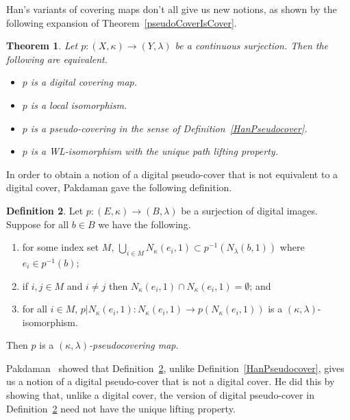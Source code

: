 \documentclass{article} \UseRawInputEncoding
\theoremstyle{plain}
\newtheorem{thm}{Theorem}
\theoremstyle{definition}
\newtheorem{definition}[thm]{Definition}
\numberwithin{thm}{section}
\begin{document}
Han's variants of covering maps don't all give us new notions, as
shown by the following expansion of Theorem~\ref{pseudoCoverIsCover}.

\begin{thm}
{\rm \cite{BxVariants}}
\label{coverEquivs}
 Let $p: (X,\kappa) \to (Y,\lambda)$ be a continuous
    surjection. Then the following are equivalent.
    \begin{itemize}
        \item $p$ is a digital covering map.
        \item $p$ is a local isomorphism.
        \item $p$ is a pseudo-covering in the sense of
            Definition~\ref{HanPseudocover}.
        \item $p$ is a WL-isomorphism with the unique
              path lifting property.
\end{itemize}
\end{thm}

In order to obtain a notion of a digital pseudo-cover that is not equivalent to
a digital cover, Pakdaman gave the following definition.

\begin{definition}
    \label{PakPseudocovering}
    {\rm \cite{Pak22}}
    Let $p: (E,\kappa) \to (B,\lambda)$ be a surjection
    of digital images. Suppose for all $b \in B$ we
    have the following.
    \begin{enumerate}
        \item for some index set $M$,
              $\bigcup_{i \in M} N_{\kappa}(e_i,1)
              \subset p^{-1}(N_{\lambda}(b,1))$ where
              $e_i \in p^{-1}(b)$;
        \item if $i,j \in M$ and $i \neq j$ then
              $N_{\kappa}(e_i,1) \cap N_{\kappa}(e_i,1) =
              \emptyset$; and
        \item for all $i \in M$,
              $p|{N_{\kappa}(e_i,1)}: N_{\kappa}(e_i,1) \to
               p(N_{\kappa}(e_i,1))$ is a
               $(\kappa, \lambda)$-isomorphism.
    \end{enumerate}
    Then $p$ is a {\em $(\kappa,\lambda)$-pseudocovering map}.
\end{definition}

Pakdaman~\cite{Pak22} showed that Definition~\ref{PakPseudocovering}, unlike
Definition~\ref{HanPseudocover}, gives us a notion of a digital pseudo-cover
that is not a digital cover. He did this by showing that, unlike a digital
cover, the version of digital pseudo-cover in Definition~\ref{PakPseudocovering}
need not have the unique lifting property.
\end{document}
